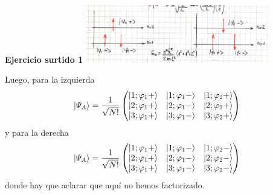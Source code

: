 \documentclass[10pt,oneside]{CBFT_book}
\begin{document}
\begin{ejemplo}{\bf Ejercicio surtido 1}
\includegraphics[width=0.6\textwidth]{images/fig_ft2_ubicacion_niveles.jpg}

Luego, para la izquierda
\[
	\Ket{\Psi_A} =
	\frac{1}{\sqrt{N!}}
	\begin{pmatrix}
	\Ket{1;\varphi_1 +} & \Ket{1;\varphi_1 -} & \Ket{1;\varphi_2 +} \\
	\Ket{2;\varphi_1 +} & \Ket{2;\varphi_1 -} & \Ket{2;\varphi_2 +} \\
	\Ket{3;\varphi_1 +} & \Ket{3;\varphi_1 -} & \Ket{3;\varphi_2 +} 
	\end{pmatrix}
\]
y para la derecha
\[
	\Ket{\Psi_A} =
	\frac{1}{\sqrt{N!}}
	\begin{pmatrix}
	\Ket{1;\varphi_1 +} & \Ket{1;\varphi_1 -} & \Ket{1;\varphi_2 -} \\
	\Ket{2;\varphi_1 +} & \Ket{2;\varphi_1 -} & \Ket{2;\varphi_2 -} \\
	\Ket{3;\varphi_1 +} & \Ket{3;\varphi_1 -} & \Ket{3;\varphi_2 -} 
	\end{pmatrix}
\]
donde hay que aclarar que aquí no hemos factorizado.

\end{ejemplo}
\end{document}
